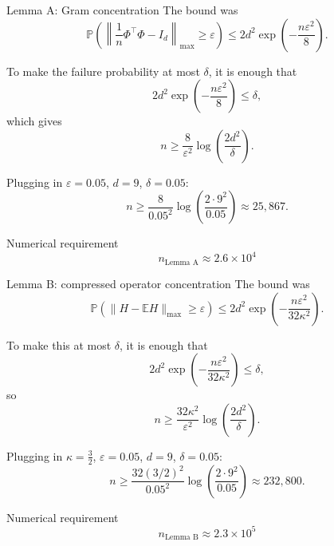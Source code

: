 \documentclass[10pt,aspectratio=169]{beamer}
\begin{document}
\begin{frame}{Lemma A: Gram concentration}
	\small
	The bound was
	\[
		\mathbb P\!\left(\left\|\frac1n\Phi^\top\Phi-I_d\right\|_{\max}\ge \varepsilon\right)
		\le 2d^2\exp\!\left(-\frac{n\varepsilon^2}{8}\right).
	\]

	To make the failure probability at most \(\delta\), it is enough that
	\[
		2d^2\exp\!\left(-\frac{n\varepsilon^2}{8}\right)\le \delta,
	\]
	which gives
	\[
		\boxed{
			n \ge \frac{8}{\varepsilon^2}\log\!\left(\frac{2d^2}{\delta}\right).
		}
	\]

	Plugging in \(\varepsilon=0.05\), \(d=9\), \(\delta=0.05\):
	\[
		n \ge \frac{8}{0.05^2}\log\!\left(\frac{2\cdot 9^2}{0.05}\right)
		\approx 25{,}867.
	\]

	\begin{block}{Numerical requirement}
		\[
			\boxed{n_{\text{Lemma A}} \approx 2.6\times 10^4}
		\]
	\end{block}

\end{frame}

\begin{frame}{Lemma B: compressed operator concentration}
	\small
	The bound was
	\[
		\mathbb P\!\left(\|H-\mathbb EH\|_{\max}\ge \varepsilon\right)
		\le 2d^2\exp\!\left(-\frac{n\varepsilon^2}{32\kappa^2}\right).
	\]

	To make this at most \(\delta\), it is enough that
	\[
		2d^2\exp\!\left(-\frac{n\varepsilon^2}{32\kappa^2}\right)\le \delta,
	\]
	so
	\[
		\boxed{
			n \ge \frac{32\kappa^2}{\varepsilon^2}\log\!\left(\frac{2d^2}{\delta}\right).
		}
	\]

	Plugging in \(\kappa=\frac32\), \(\varepsilon=0.05\), \(d=9\), \(\delta=0.05\):
	\[
		n \ge \frac{32(3/2)^2}{0.05^2}\log\!\left(\frac{2\cdot 9^2}{0.05}\right)
		\approx 232{,}800.
	\]

	\begin{block}{Numerical requirement}
		\[
			\boxed{n_{\text{Lemma B}} \approx 2.3\times 10^5}
		\]
	\end{block}

\end{frame}
\end{document}
